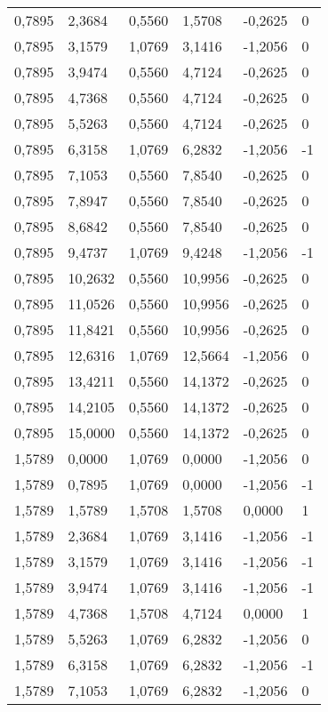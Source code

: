 \begin{longtable}{@{}llllll@{}}
		0,7895  & 2,3684  & 0,5560  & 1,5708  & -0,2625  & 0  \\
		0,7895  & 3,1579  & 1,0769  & 3,1416  & -1,2056  & 0  \\
		0,7895  & 3,9474  & 0,5560  & 4,7124  & -0,2625  & 0  \\
		0,7895  & 4,7368  & 0,5560  & 4,7124  & -0,2625  & 0  \\
		0,7895  & 5,5263  & 0,5560  & 4,7124  & -0,2625  & 0  \\
		0,7895  & 6,3158  & 1,0769  & 6,2832  & -1,2056  & -1 \\
		0,7895  & 7,1053  & 0,5560  & 7,8540  & -0,2625  & 0  \\
		0,7895  & 7,8947  & 0,5560  & 7,8540  & -0,2625  & 0  \\
		0,7895  & 8,6842  & 0,5560  & 7,8540  & -0,2625  & 0  \\
		0,7895  & 9,4737  & 1,0769  & 9,4248  & -1,2056  & -1 \\
		0,7895  & 10,2632 & 0,5560  & 10,9956 & -0,2625  & 0  \\
		0,7895  & 11,0526 & 0,5560  & 10,9956 & -0,2625  & 0  \\
		0,7895  & 11,8421 & 0,5560  & 10,9956 & -0,2625  & 0  \\
		0,7895  & 12,6316 & 1,0769  & 12,5664 & -1,2056  & 0  \\
		0,7895  & 13,4211 & 0,5560  & 14,1372 & -0,2625  & 0  \\
		0,7895  & 14,2105 & 0,5560  & 14,1372 & -0,2625  & 0  \\
		0,7895  & 15,0000 & 0,5560  & 14,1372 & -0,2625  & 0  \\
		1,5789  & 0,0000  & 1,0769  & 0,0000  & -1,2056  & 0  \\
		1,5789  & 0,7895  & 1,0769  & 0,0000  & -1,2056  & -1 \\
		1,5789  & 1,5789  & 1,5708  & 1,5708  & 0,0000   & 1  \\
		1,5789  & 2,3684  & 1,0769  & 3,1416  & -1,2056  & -1 \\
		1,5789  & 3,1579  & 1,0769  & 3,1416  & -1,2056  & -1 \\
		1,5789  & 3,9474  & 1,0769  & 3,1416  & -1,2056  & -1 \\
		1,5789  & 4,7368  & 1,5708  & 4,7124  & 0,0000   & 1  \\
		1,5789  & 5,5263  & 1,0769  & 6,2832  & -1,2056  & 0  \\
		1,5789  & 6,3158  & 1,0769  & 6,2832  & -1,2056  & -1 \\
		1,5789  & 7,1053  & 1,0769  & 6,2832  & -1,2056  & 0  \\

\end{longtable}
